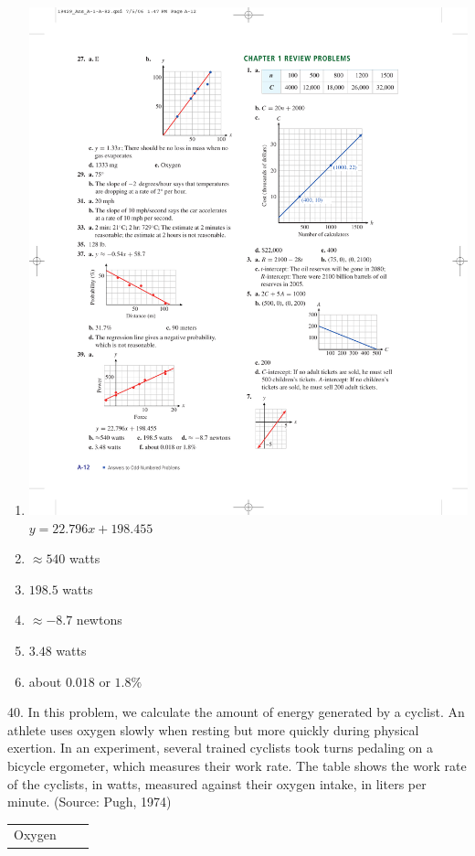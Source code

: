 \documentclass[10pt,]{book}
\makeatletter
\theoremstyle{plain}
\theoremstyle{definition}
\theoremstyle{definition}
\theoremstyle{definition}
\theoremstyle{definition}
\numberwithin{equation}{part}
\newcommand{\hrulethin}  {\noalign{\hrule height 0.04em}}
\newcommand{\tablecelllines}[3]%
{\begin{tabular}[#2]{@{}#1@{}}#3\end{tabular}}
\makeatother
\begin{document}
\begin{exerciselist}
\begin{multicols}{2}
\begin{enumerate}[label=*\alph**]
\item\hypertarget{li-1500}{}\includegraphics[width=0.85\linewidth]{images/fig-ans-1-6-39}
 \(y = 22.796x + 198.455\)%
\item\hypertarget{li-1501}{}\(\approx 540\) watts%
\item\hypertarget{li-1502}{}\(198.5\) watts%
\item\hypertarget{li-1503}{}\(\approx -8.7\) newtons%
\item\hypertarget{li-1504}{}\(3.48\) watts%
\item\hypertarget{li-1505}{}about \(0.018\) or \(1.8\%\)%
\end{enumerate}
\end{multicols}
%
\item[40.]\hypertarget{exercise-396}{}In this problem, we calculate the amount of energy generated by a cyclist. An athlete uses oxygen slowly when resting but more quickly during physical exertion. In an experiment, several trained cyclists took turns pedaling on a bicycle ergometer, which measures their work rate. The table shows the work rate of the cyclists, in watts, measured against their oxygen intake, in liters per minute. (Source: Pugh, 1974) \leavevmode%
\begin{table}
\centering
\begin{tabular}{AlA}\hrulethin
\tablecelllines{l}{m}
{Oxygen\\
}
\end{tabular}
\end{table}
\end{exerciselist}
\end{document}
